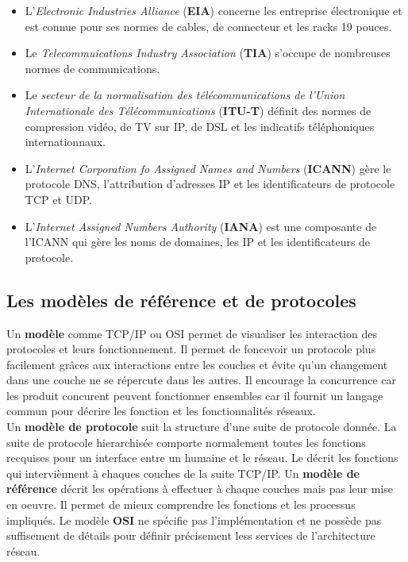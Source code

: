  \begin{itemize}
	 \item L'\textit{Electronic Industries Alliance} (\textbf{EIA}) concerne les entreprise électronique et est connue pour ses normes de cables, de connecteur et les racks 19 pouces.
	 \item Le \textit{Telecommuications Industry Association} (\textbf{TIA}) s'occupe de nombreuses normes de communications.
	 \item Le \textit{secteur de la normalisation des télécommunications de l'Union Internationale des Télécommunications} (\textbf{ITU-T}) définit des normes de compression vidéo, de TV sur IP, de DSL et les indicatifs téléphoniques internationnaux.
	 \item L'\textit{Internet Corporation fo Assigned Names and Numbers} (\textbf{ICANN}) gère le protocole DNS, l'attribution d'adresses IP et les identificateurs de protocole TCP et UDP\@.
	 \item L'\textit{Internet Assigned Numbers Authority} (\textbf{IANA}) est une composante de l'ICANN qui gère les noms de domaines, les IP et les identificateurs de protocole.
 \end{itemize}

 \subsection{Les modèles de référence et de protocoles}
 Un \textbf{modèle} comme TCP/IP ou OSI permet de visualiser les interaction des protocoles et leurs fonctionnement. Il permet de foncevoir un protocole plus facilement grâces aux interactions entre les couches et évite qu'un changement dans une couche ne se répercute dans les autres. Il encourage la concurrence car les produit concurent peuvent fonctionner ensembles car il fournit un langage commun pour décrire les fonction et les fonctionnalités réseaux.\\

 \indent
 Un \textbf{modèle de protocole} suit la structure d'une suite de protocole donnée. La suite de protocole hierarchisée comporte normalement toutes les fonctions recquises pour un interface entre un humaine et le réseau. Le  décrit les fonctions qui interviènnent à chaques couches de la suite TCP/IP\@.
 \indent
 Un \textbf{modèle de référence} décrit les opérations à effectuer à chaque couches mais pas leur mise en oeuvre. Il permet de mieux comprendre les fonctions et les processus impliqués. Le modèle \textbf{OSI} ne spécifie pas l'implémentation et ne possède pas suffisement de détails pour définir précisement less services de l'architecture réseau.

